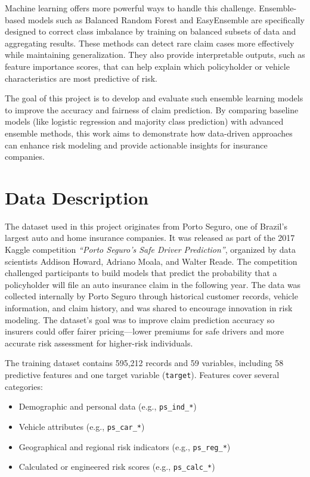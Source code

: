 \documentclass[11pt]{article}
\begin{document}
Machine learning offers more powerful ways to handle this challenge. Ensemble-based models such as Balanced Random Forest and EasyEnsemble are specifically designed to correct class imbalance by training on balanced subsets of data and aggregating results. These methods can detect rare claim cases more effectively while maintaining generalization. They also provide interpretable outputs, such as feature importance scores, that can help explain which policyholder or vehicle characteristics are most predictive of risk.

The goal of this project is to develop and evaluate such ensemble learning models to improve the accuracy and fairness of claim prediction. By comparing baseline models (like logistic regression and majority class prediction) with advanced ensemble methods, this work aims to demonstrate how data-driven approaches can enhance risk modeling and provide actionable insights for insurance companies.

\section{Data Description}
The dataset used in this project originates from Porto Seguro, one of Brazil’s largest auto and home insurance companies. It was released as part of the 2017 Kaggle competition \textit{“Porto Seguro’s Safe Driver Prediction”}, organized by data scientists Addison Howard, Adriano Moala, and Walter Reade. The competition challenged participants to build models that predict the probability that a policyholder will file an auto insurance claim in the following year. The data was collected internally by Porto Seguro through historical customer records, vehicle information, and claim history, and was shared to encourage innovation in risk modeling. The dataset’s goal was to improve claim prediction accuracy so insurers could offer fairer pricing—lower premiums for safe drivers and more accurate risk assessment for higher-risk individuals.

The training dataset contains 595,212 records and 59 variables, including 58 predictive features and one target variable (\texttt{target}). Features cover several categories:
\begin{itemize}
    \item Demographic and personal data (e.g., \texttt{ps\_ind\_*})
    \item Vehicle attributes (e.g., \texttt{ps\_car\_*})
    \item Geographical and regional risk indicators (e.g., \texttt{ps\_reg\_*})
    \item Calculated or engineered risk scores (e.g., \texttt{ps\_calc\_*})
\end{itemize}
\end{document}
